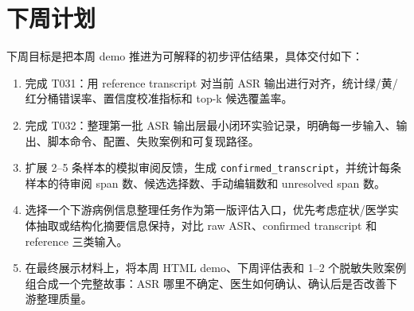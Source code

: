 \documentclass[UTF8,a4paper,12pt]{ctexart}
\begin{document}
\section{下周计划}

下周目标是把本周 demo 推进为可解释的初步评估结果，具体交付如下：

\begin{enumerate}
  \item 完成 T031：用 reference transcript 对当前 ASR 输出进行对齐，统计绿/黄/红分桶错误率、置信度校准指标和 top-k 候选覆盖率。
  \item 完成 T032：整理第一批 ASR 输出层最小闭环实验记录，明确每一步输入、输出、脚本命令、配置、失败案例和可复现路径。
  \item 扩展 2--5 条样本的模拟审阅反馈，生成 \texttt{confirmed\_transcript}，并统计每条样本的待审阅 span 数、候选选择数、手动编辑数和 unresolved span 数。
  \item 选择一个下游病例信息整理任务作为第一版评估入口，优先考虑症状/医学实体抽取或结构化摘要信息保持，对比 raw ASR、confirmed transcript 和 reference 三类输入。
  \item 在最终展示材料上，将本周 HTML demo、下周评估表和 1--2 个脱敏失败案例组合成一个完整故事：ASR 哪里不确定、医生如何确认、确认后是否改善下游整理质量。
\end{enumerate}
\end{document}
